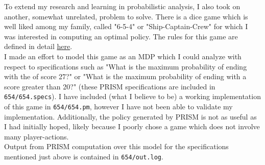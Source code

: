 \documentclass{article}
\begin{document}
To extend my research and learning in probabilistic analysis, I also took on another, somewhat unrelated, problem to solve. There is a dice game which is well liked among my family, called "6-5-4" or "Ship-Captain-Crew" for which I was interested in computing an optimal policy. The rules for this game are defined in detail \href{https://en.wikipedia.org/wiki/Ship,_captain,_and_crew}{here}. \\

I made an effort to model this game as an MDP which I could analyze with respect to specifications such as "What is the maximum probability of ending with the of score 27?" or "What is the maximum probability of ending with a score greater than 20?" (these PRISM specifications are included in \texttt{654/654.specs}). I have included (what I believe to be) a working implementation of this game in \texttt{654/654.pm}, however I have not been able to validate my implementation. Additionally, the policy generated by PRISM is not as useful as I had initially hoped, likely because I poorly chose a game which does not involve many player-actions. \\

Output from PRISM computation over this model for the specifications mentioned just above is contained in \texttt{654/out.log}.
\end{document}
